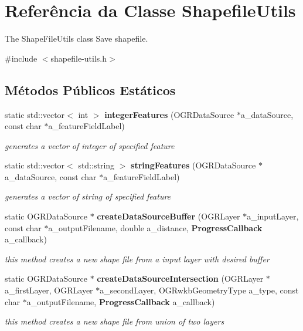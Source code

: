 \section{Referência da Classe Shapefile\+Utils}
\label{class_shapefile_utils}


The Shape\+File\+Utils class  Save shapefile.  




{\ttfamily \#include $<$shapefile-\/utils.\+h$>$}

\subsection*{Métodos Públicos Estáticos}
\begin{DoxyCompactItemize}
\item 
static std\+::vector$<$ int $>$ {\bf integer\+Features} (O\+G\+R\+Data\+Source $\ast$a\+\_\+data\+Source, const char $\ast$a\+\_\+feature\+Field\+Label)
\begin{DoxyCompactList}\small\item\em generates a vector of integer of specified feature \end{DoxyCompactList}\item 
static std\+::vector$<$ std\+::string $>$ {\bf string\+Features} (O\+G\+R\+Data\+Source $\ast$a\+\_\+data\+Source, const char $\ast$a\+\_\+feature\+Field\+Label)
\begin{DoxyCompactList}\small\item\em generates a vector of string of specified feature \end{DoxyCompactList}\item 
static O\+G\+R\+Data\+Source $\ast$ {\bf create\+Data\+Source\+Buffer} (O\+G\+R\+Layer $\ast$a\+\_\+input\+Layer, const char $\ast$a\+\_\+output\+Filename, double a\+\_\+distance, {\bf Progress\+Callback} a\+\_\+callback)
\begin{DoxyCompactList}\small\item\em this method creates a new shape file from a input layer with desired buffer \end{DoxyCompactList}\item 
static O\+G\+R\+Data\+Source $\ast$ {\bf create\+Data\+Source\+Intersection} (O\+G\+R\+Layer $\ast$a\+\_\+first\+Layer, O\+G\+R\+Layer $\ast$a\+\_\+second\+Layer, O\+G\+Rwkb\+Geometry\+Type a\+\_\+type, const char $\ast$a\+\_\+output\+Filename, {\bf Progress\+Callback} a\+\_\+callback)
\begin{DoxyCompactList}\small\item\em this method creates a new shape file from union of two layers \end{DoxyCompactList}\item 

\end{DoxyCompactItemize}
